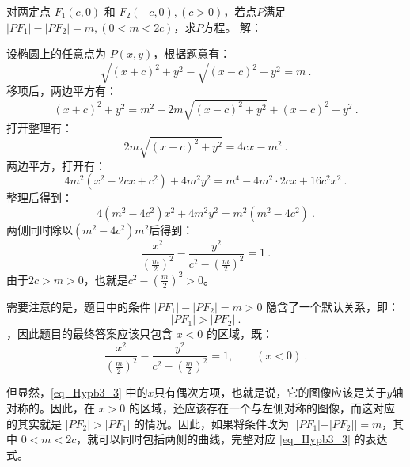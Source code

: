 \begin{example}{对两定点 $F_1(c, 0)$ 和 $F_2(-c, 0),(c>0)$，若点$P$满足$|PF_1| - |PF_2| = m,(0<m <2c)$，求$P$方程。}
解：

设椭圆上的任意点为 $P(x, y)$，根据题意有：
\begin{equation}
\sqrt{(x + c)^2 + y^2} - \sqrt{(x - c)^2 + y^2} = m~.
\end{equation}
移项后，两边平方有：
\begin{equation}
(x + c)^2 + y^2 = m^2 + 2m\sqrt{(x - c)^2 + y^2} + (x - c)^2 + y^2~.
\end{equation}
打开整理有：
\begin{equation}
2m\sqrt{(x - c)^2 + y^2}= 4cx - m^2~.
\end{equation}
两边平方，打开有：
\begin{equation}\label{eq_Hypb3_6}
4m^2(x^2 - 2cx+c^2) + 4m^2y^2= m^4-4m^2\cdot2cx+16c^2x^2~.
\end{equation}
整理后得到：
\begin{equation}
4(m^2 -4c^2)x^2 + 4m^2y^2= m^2(m^2-4c^2)~.
\end{equation}
两侧同时除以$(m^2-4c^2)m^2$后得到：
\begin{equation}\label{eq_Hypb3_3}
\frac{x^2}{\left(\displaystyle\frac{m}{2}\right)^2} -\frac{y^2}{\displaystyle c^2-\left(\frac{m}{2}\right)^2}=1~.
\end{equation}
由于$2c>m>0$，也就是$\displaystyle c^2-\left(\frac{m}{2}\right)^2>0$。

需要注意的是，题目中的条件 $|PF_1| - |PF_2| = m > 0$ 隐含了一个默认关系，即：
\begin{equation}
|PF_1| > |PF_2|~.
\end{equation}
，因此题目的最终答案应该只包含 $x < 0$ 的区域，既：
\begin{equation}
\frac{x^2}{\left(\displaystyle\frac{m}{2}\right)^2} -\frac{y^2}{\displaystyle c^2-\left(\frac{m}{2}\right)^2}=1,\qquad(x<0)~.
\end{equation}

但显然，\autoref{eq_Hypb3_3} 中的$x$只有偶次方项，也就是说，它的图像应该是关于$y$轴对称的。因此，在 $x> 0$ 的区域，还应该存在一个与左侧对称的图像，而这对应的其实就是 $|PF_2| > |PF_1|$ 的情况。因此，如果将条件改为 $||PF_1| - |PF_2|| = m$，其中 $0 < m < 2c$，就可以同时包括两侧的曲线，完整对应 \autoref{eq_Hypb3_3} 的表达式。
\end{example}

